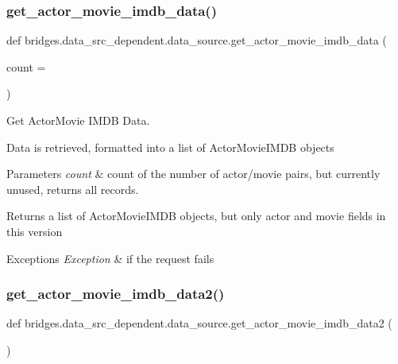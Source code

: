 \subsubsection{\texorpdfstring{get\+\_\+actor\+\_\+movie\+\_\+imdb\+\_\+data()}{get\_actor\_movie\_imdb\_data()}}
{\footnotesize\ttfamily def bridges.\+data\+\_\+src\+\_\+dependent.\+data\+\_\+source.\+get\+\_\+actor\+\_\+movie\+\_\+imdb\+\_\+data (\begin{DoxyParamCaption}\item[{}]{count = {} }\end{DoxyParamCaption})}



Get Actor\+Movie I\+M\+DB Data. 

Data is retrieved, formatted into a list of Actor\+Movie\+I\+M\+DB objects


\begin{DoxyParams}{Parameters}
{\em count} & count of the number of actor/movie pairs, but currently unused, returns all records.\\
\hline
\end{DoxyParams}
\begin{DoxyReturn}{Returns}
a list of Actor\+Movie\+I\+M\+DB objects, but only actor and movie fields in this version 
\end{DoxyReturn}

\begin{DoxyExceptions}{Exceptions}
{\em Exception} & if the request fails \\
\hline
\end{DoxyExceptions}
\mbox{\label{namespacebridges_1_1data__src__dependent_1_1data__source_a279aa1a757f4838f3d048651cb1a7d26}} 
\subsubsection{\texorpdfstring{get\+\_\+actor\+\_\+movie\+\_\+imdb\+\_\+data2()}{get\_actor\_movie\_imdb\_data2()}}
{\footnotesize\ttfamily def bridges.\+data\+\_\+src\+\_\+dependent.\+data\+\_\+source.\+get\+\_\+actor\+\_\+movie\+\_\+imdb\+\_\+data2 (\begin{DoxyParamCaption}{ }\end{DoxyParamCaption})}



